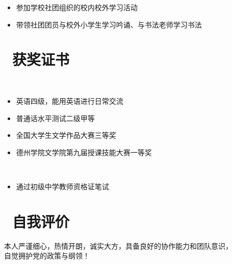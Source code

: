 \documentclass{resume}
\begin{document}
\begin{onehalfspacing}
\begin{itemize}
  \item 参加学校社团组织的校内校外学习活动
  \item 带领社团团员与校外小学生学习吟诵、与书法老师学习书法
\end{itemize}
\end{onehalfspacing}

\vspace{1em}


\section{\faCogs\ 获奖证书}
\vspace{0.5em}
\begin{description}[parsep=0.5ex]
  \item[2015年] \ 
    \begin{itemize}
      \item 英语四级，能用英语进行日常交流
      \item 普通话水平测试二级甲等
      \item 全国大学生文学作品大赛三等奖
      \item 德州学院文学院第九届授课技能大赛一等奖
    \end{itemize}
    
  \item[2017年] \ 
    \begin{itemize}
      \item 通过初级中学教师资格证笔试
    \end{itemize}
\end{description}

\vspace{1em}

\section{\faCogs\ 自我评价}
\vspace{0.5em}
本人严谨细心，热情开朗，诚实大方，具备良好的协作能力和团队意识，\\
自觉拥护党的政策与纲领！



%
%
\end{document}
